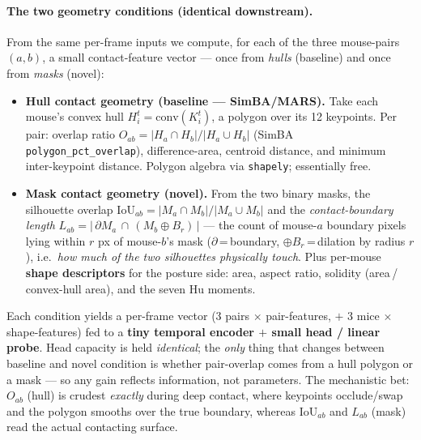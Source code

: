 \documentclass[11pt]{article}
\begin{document}
\paragraph{The two geometry conditions (identical downstream).} From the same per-frame inputs we
compute, for each of the three mouse-pairs $(a,b)$, a small contact-feature vector — once from
\emph{hulls} (baseline) and once from \emph{masks} (novel):
\begin{itemize}
  \item \textbf{Hull contact geometry (baseline — SimBA/MARS).} Take each mouse's convex hull
    $H_i^t=\mathrm{conv}(K_i^t)$, a polygon over its 12 keypoints. Per pair: overlap ratio
    $O_{ab}=\lvert H_a\cap H_b\rvert / \lvert H_a\cup H_b\rvert$ (SimBA \texttt{polygon\_pct\_overlap}),
    difference-area, centroid distance, and minimum inter-keypoint distance. Polygon algebra via
    \texttt{shapely}; essentially free.
  \item \textbf{Mask contact geometry (novel).} From the two binary masks, the silhouette overlap
    $\mathrm{IoU}_{ab}=\lvert M_a\cap M_b\rvert / \lvert M_a\cup M_b\rvert$ and the
    \emph{contact-boundary length}
    $L_{ab}=\bigl\lvert\,\partial M_a \,\cap\, (M_b \oplus B_r)\,\bigr\rvert$ — the count of
    mouse-$a$ boundary pixels lying within $r$ px of mouse-$b$'s mask ($\partial$\,=\,boundary,
    $\oplus B_r$\,=\,dilation by radius $r$), i.e.\ \emph{how much of the two silhouettes physically
    touch}. Plus per-mouse \textbf{shape descriptors} for the posture side: area, aspect ratio,
    solidity (area\,/\,convex-hull area), and the seven Hu moments.
\end{itemize}
Each condition yields a per-frame vector (3 pairs $\times$ pair-features, $+$ 3 mice $\times$
shape-features) fed to a \textbf{tiny temporal encoder $+$ small head / linear probe}. Head
capacity is held \emph{identical}; the \emph{only} thing that changes between baseline and novel
condition is whether pair-overlap comes from a hull polygon or a mask — so any gain reflects
information, not parameters. The mechanistic bet: $O_{ab}$ (hull) is crudest \emph{exactly} during
deep contact, where keypoints occlude/swap and the polygon smooths over the true boundary, whereas
$\mathrm{IoU}_{ab}$ and $L_{ab}$ (mask) read the actual contacting surface.
\end{document}
